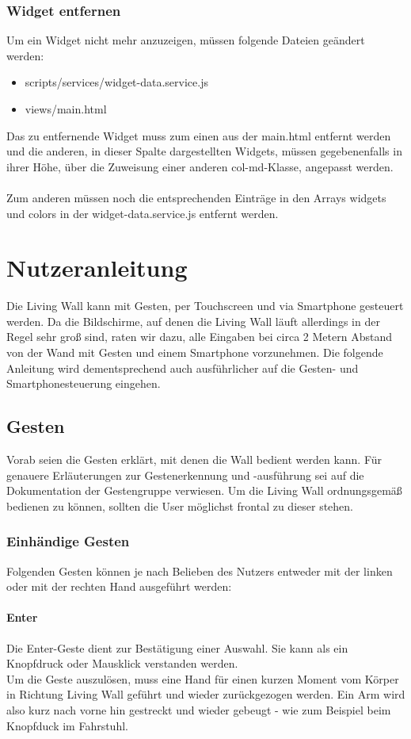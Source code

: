 \documentclass[10pt,a4paper]{report}
\newcommand{\code}[1]{{\fontfamily{cmvtt}\selectfont #1}}
\begin{document}
		\subsection{Widget entfernen}
			Um ein Widget nicht mehr anzuzeigen, müssen folgende Dateien geändert werden:
			\begin{itemize}
				\item{} scripts/services/widget-data.service.js
				\item{} views/main.html
			\end{itemize}
			Das zu entfernende Widget muss zum einen aus der \code{main.html} entfernt werden und die anderen, in dieser Spalte dargestellten Widgets, müssen gegebenenfalls in ihrer Höhe, über die Zuweisung einer anderen \code{col-md}-Klasse, angepasst werden.\\\\
			Zum anderen müssen noch die entsprechenden Einträge in den Arrays \code{widgets} und \code{colors} in der \code{widget-data.service.js} entfernt werden.



\chapter{Nutzeranleitung}
Die Living Wall kann mit Gesten, per Touchscreen und via Smartphone gesteuert werden. Da die Bildschirme, auf denen die Living Wall läuft allerdings in der Regel sehr groß sind, raten wir dazu, alle Eingaben bei circa 2 Metern Abstand von der Wand mit Gesten und einem Smartphone vorzunehmen. Die folgende Anleitung wird dementsprechend auch ausführlicher auf die Gesten- und Smartphonesteuerung eingehen.

	\section{Gesten}
	Vorab seien die Gesten erklärt, mit denen die Wall bedient werden kann. Für genauere Erläuterungen zur Gestenerkennung und -ausführung sei auf die Dokumentation der Gestengruppe verwiesen. Um die Living Wall ordnungsgemäß bedienen zu können, sollten die User möglichst frontal zu dieser stehen.
		\subsection{Einhändige Gesten}
		Folgenden Gesten können je nach Belieben des Nutzers entweder mit der linken oder mit der rechten Hand ausgeführt werden:
		\subsubsection{Enter}
		Die Enter-Geste dient zur Bestätigung einer Auswahl. Sie kann als ein Knopfdruck oder Mausklick verstanden werden.\\
Um die Geste auszulösen, muss eine Hand für einen kurzen Moment vom Körper in Richtung Living Wall geführt und wieder zurückgezogen werden. Ein Arm wird also kurz nach vorne hin gestreckt und wieder gebeugt - wie zum Beispiel beim Knopfduck im Fahrstuhl.
\end{document}
